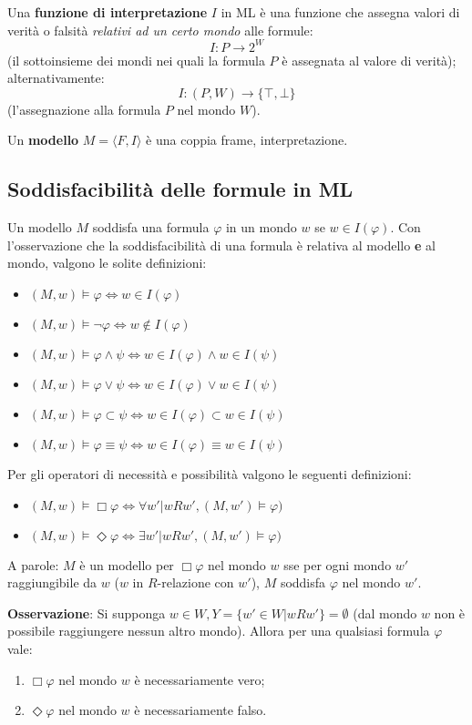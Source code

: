 Una \textbf{funzione di interpretazione} $I$ in ML è una funzione che assegna valori di verità o falsità \textit{relativi ad un certo mondo} alle formule:\\ $$I: P \to 2 ^ W$$ (il sottoinsieme dei mondi nei quali la formula $P$ è assegnata al valore di verità);
alternativamente: $$I: (P, W) \to \lbrace \top, \bot \rbrace$$ (l'assegnazione alla formula $P$ nel mondo $W$).

Un \textbf{modello} $M = \langle F, I \rangle$ è una coppia frame, interpretazione.

\subsection{Soddisfacibilità delle formule in ML}
Un modello $M$ soddisfa una formula $\varphi$ in un mondo $w$ se $w \in I(\varphi)$. Con l'osservazione che la soddisfacibilità di una formula è relativa al modello \textbf{e} al mondo, valgono le solite definizioni:
\begin{itemize}
\item $(M, w) \models \varphi \iff w \in I(\varphi)$
\item $(M, w) \models \lnot \varphi \iff w \not\in I(\varphi)$
\item $(M, w) \models \varphi \land \psi \iff w \in I(\varphi) \land w \in I(\psi)$
\item $(M, w) \models \varphi \lor \psi \iff w \in I(\varphi) \lor w \in I(\psi)$
\item $(M, w) \models \varphi \subset \psi \iff w \in I(\varphi) \subset w \in I(\psi)$
\item $(M, w) \models \varphi \equiv \psi \iff w \in I(\varphi) \equiv w \in I(\psi)$
\end{itemize}
Per gli operatori di necessità e possibilità valgono le seguenti definizioni:
\begin{itemize}
\item $(M, w) \models \Box \varphi \iff \forall w' | wRw', (M, w') \models \varphi)$
\item $(M, w) \models \Diamond \varphi \iff \exists w' | wRw', (M, w') \models \varphi)$
\end{itemize}
A parole: $M$ è un modello per $\Box \varphi$ nel mondo $w$ sse per ogni mondo $w'$ raggiungibile da $w$ ($w$ in $R$-relazione con $w'$), $M$ soddisfa $\varphi$ nel mondo $w'$.

\textbf{Osservazione}: Si supponga $w \in W, Y = \lbrace w' \in W | wRw' \rbrace = \emptyset$ (dal mondo $w$ non è possibile raggiungere nessun altro mondo). Allora per una qualsiasi formula $\varphi$ vale:
\begin{enumerate}
\item $\Box \varphi$ nel mondo $w$ è necessariamente vero;
\item $\Diamond \varphi$ nel mondo $w$ è necessariamente falso.
\end{enumerate}

